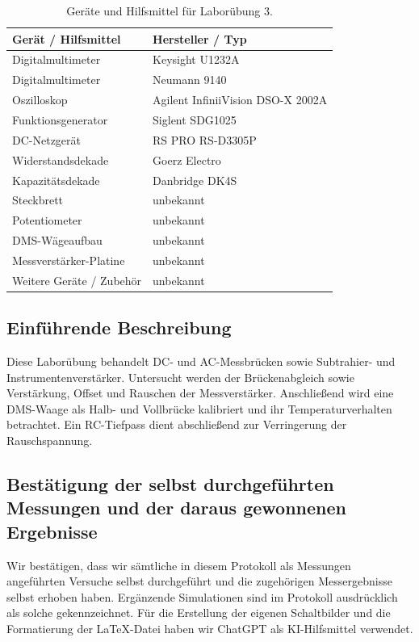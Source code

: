 \documentclass[11pt,a4paper]{scrartcl}
\begin{document}
\begin{table}[htbp]
  \centering
  \caption{Geräte und Hilfsmittel für Laborübung 3.}
  \label{tab:geraete}
  \begingroup
  \small
  \setlength{\tabcolsep}{3pt}
  \renewcommand{\arraystretch}{1.3}
  \begin{tabular}{@{}ll@{}}
    \toprule
    Gerät / Hilfsmittel & Hersteller / Typ \\
    \midrule
    Digitalmultimeter & Keysight U1232A  \\
    Digitalmultimeter & Neumann 9140 \\
    Oszilloskop & Agilent InfiniiVision DSO-X 2002A \\
    Funktionsgenerator & Siglent SDG1025 \\
    DC-Netzgerät & RS PRO RS-D3305P \\
    Widerstandsdekade & Goerz Electro \\
    Kapazitätsdekade & Danbridge DK4S \\
    Steckbrett & unbekannt \\
    Potentiometer & unbekannt \\
    DMS-Wägeaufbau & unbekannt \\
    Messverstärker-Platine & unbekannt \\
    Weitere Geräte / Zubehör & unbekannt \\
    \bottomrule
  
  \end{tabular}
  \endgroup
\end{table}
\clearpage
\subsection{Einführende Beschreibung}
Diese Laborübung behandelt DC- und AC-Messbrücken sowie Subtrahier- und Instrumentenverstärker.
Untersucht werden der Brückenabgleich sowie Verstärkung, Offset und Rauschen der Messverstärker.
Anschließend wird eine DMS-Waage als Halb- und Vollbrücke kalibriert und ihr Temperaturverhalten betrachtet.
Ein RC-Tiefpass dient abschließend zur Verringerung der Rauschspannung.

\subsection{Bestätigung der selbst durchgeführten Messungen und der daraus gewonnenen Ergebnisse}
Wir bestätigen, dass wir sämtliche in diesem Protokoll als Messungen angeführten Versuche selbst durchgeführt und die zugehörigen Messergebnisse selbst erhoben haben.
Ergänzende Simulationen sind im Protokoll ausdrücklich als solche gekennzeichnet.
Für die Erstellung der eigenen Schaltbilder und die Formatierung der \LaTeX-Datei haben wir ChatGPT als KI-Hilfsmittel verwendet.
\end{document}
